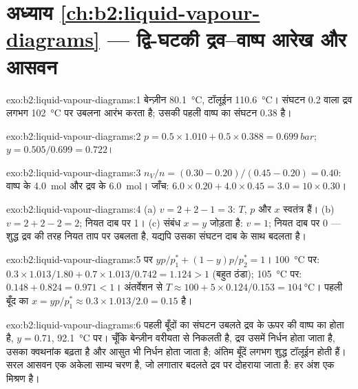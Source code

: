 \section*{अध्याय \ref{ch:b2:liquid-vapour-diagrams} --- द्वि-घटकी द्रव--वाष्प आरेख और आसवन}

\begin{solution}{exo:b2:liquid-vapour-diagrams:1}
बेन्ज़ीन \qty{80.1}{\degreeCelsius}, टॉलूईन \qty{110.6}{\degreeCelsius}। संघटन 0.2
वाला द्रव लगभग \qty{102}{\degreeCelsius} पर उबलना आरंभ करता है; उसकी पहली
वाष्प का संघटन 0.38 है।
\end{solution}

\begin{solution}{exo:b2:liquid-vapour-diagrams:2}
$p = 0.5 \times 1.010 + 0.5 \times 0.388 = \qty{0.699}{bar}$;
$y = 0.505/0.699 = 0.722$।
\end{solution}

\begin{solution}{exo:b2:liquid-vapour-diagrams:3}
$n_V/n = (0.30 - 0.20)/(0.45 - 0.20) = 0.40$: वाष्प के \qty{4.0}{mol} और
द्रव के \qty{6.0}{mol}। जाँच: $6.0 \times 0.20 + 4.0 \times 0.45 = 3.0 = 10
\times 0.30$।
\end{solution}

\begin{solution}{exo:b2:liquid-vapour-diagrams:4}
(a) $v = 2 + 2 - 1 = 3$: $T$, $p$ और $x$ स्वतंत्र हैं। (b) $v = 2 + 2 - 2 = 2$;
नियत दाब पर 1। (c)  संबंध $x = y$ जोड़ता है: $v = 1$; नियत
दाब पर 0 ---  शुद्ध द्रव की तरह नियत ताप पर उबलता है,
यद्यपि उसका संघटन दाब के साथ बदलता है।
\end{solution}

\begin{solution}{exo:b2:liquid-vapour-diagrams:5}
 पर $yp/p_1^* + (1 - y)p/p_2^* = 1$। \qty{100}{\degreeCelsius} पर:
$0.3 \times 1.013/1.80 + 0.7 \times 1.013/0.742 = 1.124 > 1$ (बहुत ठंडा);
\qty{105}{\degreeCelsius} पर: $0.148 + 0.824 = 0.971 < 1$। अंतर्वेशन से $T \approx
100 + 5 \times 0.124/0.153 = \qty{104}{\degreeCelsius}$। पहली बूँद का $x =
yp/p_1^* \approx 0.3 \times 1.013/2.0 = 0.15$ है।
\end{solution}

\begin{solution}{exo:b2:liquid-vapour-diagrams:6}
पहली बूँदों का संघटन उबलते द्रव के ऊपर की वाष्प का होता है,
$y = 0.71$, \qty{92.1}{\degreeCelsius} पर। चूँकि बेन्ज़ीन वरीयता से निकलती है,
द्रव उसमें निर्धन होता जाता है, उसका क्वथनांक बढ़ता है और आसुत भी
निर्धन होता जाता है; अंतिम बूँदें लगभग शुद्ध टॉलूईन होती हैं। सरल आसवन एक
अकेला साम्य चरण है, जो लगातार बदलते द्रव पर दोहराया जाता है: हर
अंश एक मिश्रण है।
\end{solution}

